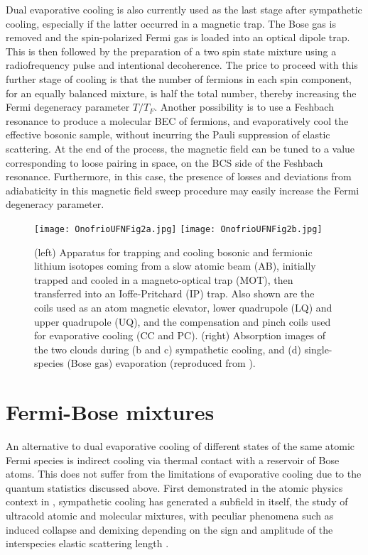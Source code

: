 \documentclass[pra,letterpaper,twocolumn,showpacs,superscriptaddress]{revtex4}
\begin{document}
Dual evaporative cooling is also currently used as the last stage after sympathetic cooling, especially if the latter occurred in 
a magnetic trap. The Bose gas is removed and the spin-polarized Fermi gas is loaded into an optical dipole trap. This is 
then followed by the preparation of a two spin state mixture using a radiofrequency pulse and intentional decoherence.
The price to proceed with this further stage of cooling is that the number of fermions in each spin component, for an equally 
balanced mixture, is half the total number,  thereby increasing the Fermi degeneracy parameter $T/T_F$. Another possibility 
is to use a Feshbach resonance to produce a molecular BEC of fermions, and evaporatively cool the effective bosonic sample, without incurring 
the Pauli suppression of elastic scattering. At the end of the process, the magnetic field can be tuned to a value corresponding to 
loose pairing in space, on the BCS side of the Feshbach resonance. Furthermore, in this case, the presence of losses and deviations from adiabaticity in this 
magnetic field sweep procedure may easily increase the Fermi degeneracy parameter.  

\begin{figure*}[t]
\begin{center}
\texttt{[image: OnofrioUFNFig2a.jpg]}
\texttt{[image: OnofrioUFNFig2b.jpg]}
\caption{(left) Apparatus for trapping and cooling bosonic and fermionic lithium 
isotopes coming from a slow atomic beam (AB), initially trapped and cooled 
in a magneto-optical trap (MOT), then transferred into an Ioffe-Pritchard (IP) trap. 
Also shown are the coils used as an atom magnetic elevator, lower quadrupole (LQ) 
and upper quadrupole (UQ), and the compensation and pinch coils used for evaporative 
cooling (CC and PC). (right) Absorption images of the two clouds during (b and c) sympathetic 
cooling, and (d) single-species (Bose gas) evaporation (reproduced from \cite{Schreck2001a}).}
\label{}
\end{center}
\end{figure*}

\section{\bf{Fermi-Bose mixtures}}

An alternative to dual evaporative cooling of different states of the same atomic Fermi species is indirect cooling via thermal 
contact with a reservoir of Bose atoms. This does not suffer from the limitations of evaporative cooling due to the quantum statistics discussed above. 
First demonstrated in the atomic physics context in \cite{Myatt1997}, sympathetic cooling has generated a subfield in itself, the study of 
ultracold atomic and molecular mixtures, with peculiar phenomena such as induced collapse and demixing depending on the sign and amplitude of the interspecies elastic scattering length \cite{Molmer1998}. 
\end{document}
